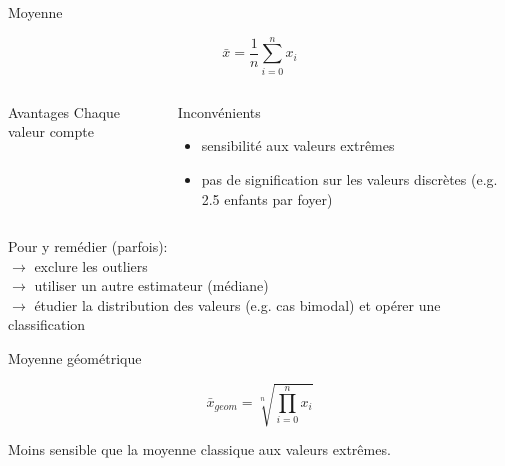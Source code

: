\documentclass{beamer}
\begin{document}
\begin{frame}{Moyenne}


$$ \bar{x} = \frac{1}{n}\sum_{i=0}^{n} x_i$$



\begin{columns}[T,onlytextwidth]
\begin{block}{Avantages}
Chaque valeur compte
\end{block}
\begin{block}{Inconvénients}
\begin{spacing}{0.9}
\begin{itemize}
  \item sensibilité aux valeurs extrêmes 
  \item pas de signification sur les valeurs discrètes (e.g. 2.5 enfants par foyer)
\end{itemize}
\end{spacing}
\end{block}
\end{columns}


\begin{spacing}{0.9}
\begin{small}
Pour y remédier (parfois): \\
$\rightarrow$ exclure les outliers\\
$\rightarrow$ utiliser un autre estimateur (médiane)\\
$\rightarrow$ étudier la distribution des valeurs (e.g. cas bimodal) et opérer une classification
\end{small}
\end{spacing}
\end{frame}



\begin{frame}{Moyenne géométrique}

$$ \bar{x}_{geom} = \sqrt[n]{\prod _{i=0}^{n} x_i}$$  


Moins sensible que la moyenne classique aux valeurs extrêmes.

\end{frame}
\end{document}
